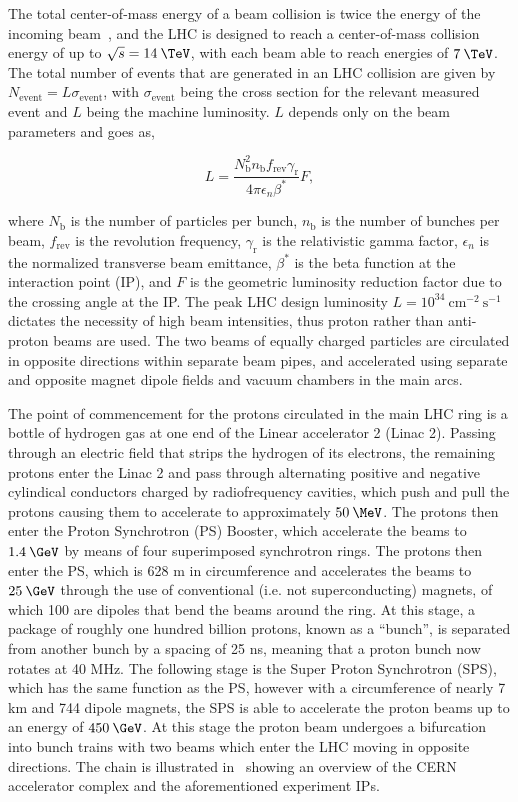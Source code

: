 The total center-of-mass energy of a beam collision is twice the energy of the incoming beam~\cite{martin2008particle}, and the LHC is designed to reach a center-of-mass collision energy of up to $\sqrt{s}=14\:\TeV$, with each beam able to reach energies of $7\:\TeV$. The total number of events that are generated in an LHC collision are given by $N_{\textrm{event}}=L\sigma_{\textrm{event}}$, with $\sigma_{\textrm{event}}$ being the cross section for the relevant measured event and $L$ being the machine luminosity. $L$ depends only on the beam parameters and goes as,

\begin{equation}
  L = \frac{N_{\textrm{b}}^{2}n_{\textrm{b}}f_{\textrm{rev}}\gamma_{\textrm{r}}}{4\pi\epsilon_n\beta^*}F,
  \label{eq:lumi}
\end{equation}

where $N_{\textrm{b}}$ is the number of particles per bunch, $n_{\textrm{b}}$ is the number of bunches per beam, $f_{\textrm{rev}}$ is the revolution frequency, $\gamma_{\textrm{r}}$ is the relativistic gamma factor, $\epsilon_n$ is the normalized transverse beam emittance, $\beta^*$ is the beta function at the interaction point (IP), and $F$ is the geometric luminosity reduction factor due to the crossing angle at the IP. The peak LHC design luminosity $L=10^{34}\:\textrm{cm}^{-2}\:\textrm{s}^{-1}$ dictates the necessity of high beam intensities, thus proton rather than anti-proton beams are used. The two beams of equally charged particles are circulated in opposite directions within separate beam pipes, and accelerated using separate and opposite magnet dipole fields and vacuum chambers in the main arcs.

The point of commencement for the protons circulated in the main LHC ring is a bottle of hydrogen gas at one end of the Linear accelerator 2 (Linac 2). Passing through an electric field that strips the hydrogen of its electrons, the remaining protons enter the Linac 2 and pass through alternating positive and negative cylindical conductors charged by radiofrequency cavities, which push and pull the protons causing them to accelerate to approximately $50\:\MeV$. The protons then enter the Proton Synchrotron (PS) Booster, which accelerate the beams to $1.4\:\GeV$ by means of four superimposed synchrotron rings. The protons then enter the PS, which is 628 m in circumference and accelerates the beams to $25\:\GeV$ through the use of conventional (i.e. not superconducting) magnets, of which 100 are dipoles that bend the beams around the ring. At this stage, a package of roughly one hundred billion protons, known as a ``bunch'', is separated from another bunch by a spacing of 25 ns, meaning that a proton bunch now rotates at 40 MHz. The following stage is the Super Proton Synchrotron (SPS), which has the same function as the PS, however with a circumference of nearly 7 km and 744 dipole magnets, the SPS is able to accelerate the proton beams up to an energy of $450\:\GeV$. At this stage the proton beam undergoes a bifurcation into bunch trains with two beams which enter the LHC moving in opposite directions. The chain is illustrated in~ showing an overview of the CERN accelerator complex and the aforementioned experiment IPs.

